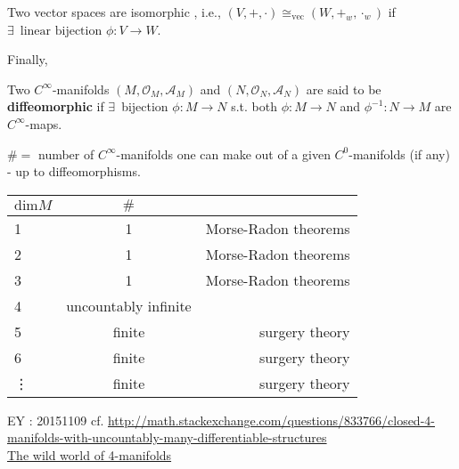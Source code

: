 Two vector spaces are isomorphic , i.e., $(V,+,\cdot) \cong_{\text{vec}} ( W,+_w,\cdot_w)$ if \\
$\exists \, \text{ linear bijection } \phi : V \to W$.

Finally,
\begin{definition}
Two $C^{\infty}$-manifolds $(M,\mathcal{O}_M, \mathcal{A}_M)$ and $(N,\mathcal{O}_N, \mathcal{A}_N)$ are said to be \textbf{diffeomorphic} if $\exists \, $ bijection $\phi : M \to N$ s.t. both $\phi : M \to N$ and $\phi^{-1} : N \to M$ are $C^{\infty}$-maps.


\end{definition}

\begin{theorem}
  $\# = $ number of $C^{\infty}$-manifolds one can make out of a given $C^0$-manifolds (if any) - up to diffeomorphisms.  

\begin{tabular}{l | c r }
  $\text{dim}M$ &  $\#$ &  \\
  \hline
  1  & 1  & Morse-Radon theorems \\
 2  & 1  & Morse-Radon theorems \\
 3 & 1  & Morse-Radon theorems \\
4 & uncountably infinite & \\
5 &   finite  & surgery theory \\
6 &  finite & surgery theory \\
\vdots & finite & surgery theory
\end{tabular}

\end{theorem}

EY : 20151109 cf. \url{http://math.stackexchange.com/questions/833766/closed-4-manifolds-with-uncountably-many-differentiable-structures}  \\
\href{http://www.maths.ed.ac.uk/~aar/papers/scorpan.pdf}{The wild world of 4-manifolds}
